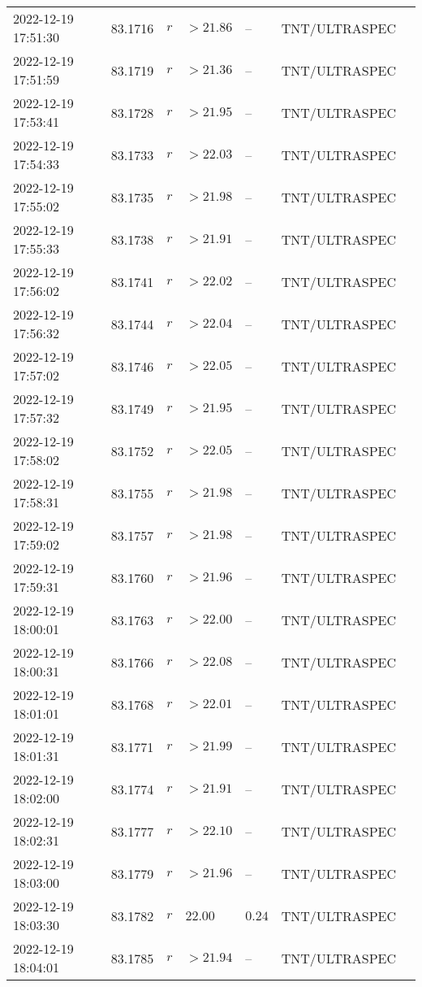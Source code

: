 \documentclass{nature_plusfigure}
\begin{document}
\begin{supplement}
\begin{center}
\begin{longtable}{lllllll}
2022-12-19 17:51:30 & 83.1716 & $r$ & $>21.86$ & -- & TNT/ULTRASPEC &  \\ 
2022-12-19 17:51:59 & 83.1719 & $r$ & $>21.36$ & -- & TNT/ULTRASPEC &  \\ 
2022-12-19 17:53:41 & 83.1728 & $r$ & $>21.95$ & -- & TNT/ULTRASPEC &  \\ 
2022-12-19 17:54:33 & 83.1733 & $r$ & $>22.03$ & -- & TNT/ULTRASPEC &  \\ 
2022-12-19 17:55:02 & 83.1735 & $r$ & $>21.98$ & -- & TNT/ULTRASPEC &  \\ 
2022-12-19 17:55:33 & 83.1738 & $r$ & $>21.91$ & -- & TNT/ULTRASPEC &  \\ 
2022-12-19 17:56:02 & 83.1741 & $r$ & $>22.02$ & -- & TNT/ULTRASPEC &  \\ 
2022-12-19 17:56:32 & 83.1744 & $r$ & $>22.04$ & -- & TNT/ULTRASPEC &  \\ 
2022-12-19 17:57:02 & 83.1746 & $r$ & $>22.05$ & -- & TNT/ULTRASPEC &  \\ 
2022-12-19 17:57:32 & 83.1749 & $r$ & $>21.95$ & -- & TNT/ULTRASPEC &  \\ 
2022-12-19 17:58:02 & 83.1752 & $r$ & $>22.05$ & -- & TNT/ULTRASPEC &  \\ 
2022-12-19 17:58:31 & 83.1755 & $r$ & $>21.98$ & -- & TNT/ULTRASPEC &  \\ 
2022-12-19 17:59:02 & 83.1757 & $r$ & $>21.98$ & -- & TNT/ULTRASPEC &  \\ 
2022-12-19 17:59:31 & 83.1760 & $r$ & $>21.96$ & -- & TNT/ULTRASPEC &  \\ 
2022-12-19 18:00:01 & 83.1763 & $r$ & $>22.00$ & -- & TNT/ULTRASPEC &  \\ 
2022-12-19 18:00:31 & 83.1766 & $r$ & $>22.08$ & -- & TNT/ULTRASPEC &  \\ 
2022-12-19 18:01:01 & 83.1768 & $r$ & $>22.01$ & -- & TNT/ULTRASPEC &  \\ 
2022-12-19 18:01:31 & 83.1771 & $r$ & $>21.99$ & -- & TNT/ULTRASPEC &  \\ 
2022-12-19 18:02:00 & 83.1774 & $r$ & $>21.91$ & -- & TNT/ULTRASPEC &  \\ 
2022-12-19 18:02:31 & 83.1777 & $r$ & $>22.10$ & -- & TNT/ULTRASPEC &  \\ 
2022-12-19 18:03:00 & 83.1779 & $r$ & $>21.96$ & -- & TNT/ULTRASPEC &  \\ 
2022-12-19 18:03:30 & 83.1782 & $r$ & $22.00$ & $0.24$ & TNT/ULTRASPEC &  \\ 
2022-12-19 18:04:01 & 83.1785 & $r$ & $>21.94$ & -- & TNT/ULTRASPEC &  \\ 

\end{longtable}
\end{center}
\end{supplement}
\end{document}
